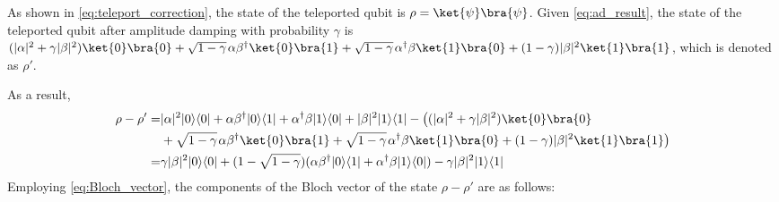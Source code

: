 As shown in \autoref{eq:teleport_correction}, the state of the teleported qubit is $\rho=\ket{\psi}\bra{\psi}$. Given \autoref{eq:ad_result}, the state of the teleported qubit after amplitude damping with probability $\gamma$ is $(|\alpha|^{2} + \gamma |\beta|^{2}) \ket{0}\bra{0} + \sqrt{1-\gamma} \hspace{1pt} \alpha \beta^{\dag} \ket{0}\bra{1} + \sqrt{1-\gamma} \hspace{1pt} \alpha^{\dag} \beta \ket{1}\bra{0} + (1-\gamma) |\beta|^{2} \ket{1}\bra{1}$, which is denoted as $\rho'$.

As a result,
\begin{equation}
  \begin{split}
   \rho - \rho' = & |\alpha|^{2} |0\rangle \langle 0 | + \alpha \beta^{\dag} |0\rangle \langle 1 | + \alpha^{\dag} \beta |1\rangle \langle 0 | + |\beta|^{2} |1\rangle \langle 1 |  - \big((|\alpha|^{2} + \gamma |\beta|^{2}) \ket{0}\bra{0}
   \\ & + \sqrt{1-\gamma} \hspace{1pt} \alpha \beta^{\dag} \ket{0}\bra{1} + \sqrt{1-\gamma} \hspace{1pt} \alpha^{\dag} \beta \ket{1}\bra{0} + (1-\gamma) |\beta|^{2} \ket{1}\bra{1}\big)\\
   = &  \gamma |\beta|^{2} |0\rangle \langle 0 | + (1-\sqrt{1-\gamma}) (\alpha \beta^{\dag} |0\rangle \langle 1 | + \alpha^{\dag} \beta |1\rangle \langle 0 |) - \gamma |\beta|^{2} |1\rangle \langle 1 |  
  \end{split}
\end{equation}
Employing \autoref{eq:Bloch_vector}, the components of the Bloch vector of the state $\rho-\rho'$ are as follows:
